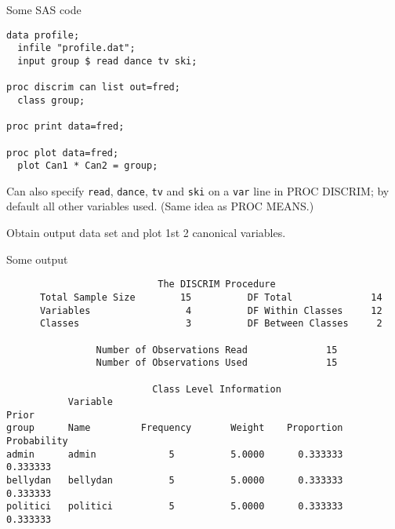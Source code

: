 \documentclass[pdf]{prosper}
\begin{document}
\begin{slide}{Some SAS code}

\begin{verbatim}
data profile;
  infile "profile.dat";
  input group $ read dance tv ski;

proc discrim can list out=fred;
  class group;

proc print data=fred;

proc plot data=fred;
  plot Can1 * Can2 = group;

\end{verbatim}

Can also specify \verb-read-, \verb-dance-, \verb-tv- and \verb-ski- on a \verb-var- line in PROC DISCRIM; by default all other variables used. (Same idea as PROC MEANS.)

\vspace{3ex}

Obtain output data set and plot 1st 2 canonical variables.

  
\end{slide}

\begin{slide}{Some output}

{\scriptsize
\begin{verbatim}
                           The DISCRIM Procedure
      Total Sample Size        15          DF Total              14
      Variables                 4          DF Within Classes     12
      Classes                   3          DF Between Classes     2

                Number of Observations Read              15
                Number of Observations Used              15

                          Class Level Information
           Variable                                                 Prior
group      Name         Frequency       Weight    Proportion  Probability
admin      admin             5          5.0000      0.333333     0.333333
bellydan   bellydan          5          5.0000      0.333333     0.333333
politici   politici          5          5.0000      0.333333     0.333333

\end{verbatim}
}
  
\end{slide}
\end{document}
